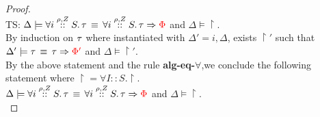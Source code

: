 \begin{proof}
  \\  
TS:  $ \Delta \models \forall i \overset{\rho, Z}{::} S.\, \tau \, \equiv \, \forall i \overset{\rho, Z}{::} S.\, \tau \Rightarrow \textcolor{red} {\Phi}$ and $ \Delta  \models \restriction$.\\
By induction on $\tau$ where instantiated with $\Delta' = i, \Delta$, exists $\restriction'$ such that $\Delta' \models \tau \, \equiv \, \tau \Rightarrow \textcolor{red} {\Phi'}$ and $ \Delta \models \restriction' $.\\
By the above statement and the rule \textbf{alg-eq-$\forall$},we conclude the following statement where $ \restriction = \forall I::S.\restriction $.\\
$ \Delta \models \forall i \overset{\rho, Z}{::} S.\, \tau \, \equiv \, \forall i \overset{\rho, Z}{::} S.\, \tau \Rightarrow \textcolor{red} {\Phi}$ and $ \Delta  \models \restriction$.\\

\end{proof}

